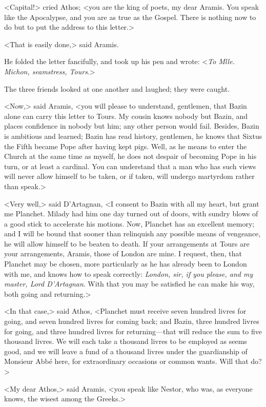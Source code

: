 <Capital!> cried Athos; <you are the king of poets, my dear Aramis. You speak like the Apocalypse, and you are as true as the Gospel. There is nothing now to do but to put the address to this letter.> 

<That is easily done,> said Aramis. 

He folded the letter fancifully, and took up his pen and wrote: <\textit{To Mlle. Michon, seamstress, Tours}.> 

The three friends looked at one another and laughed; they were caught. 

<Now,> said Aramis, <you will please to understand, gentlemen, that Bazin alone can carry this letter to Tours. My cousin knows nobody but Bazin, and places confidence in nobody but him; any other person would fail. Besides, Bazin is ambitious and learned; Bazin has read history, gentlemen, he knows that Sixtus the Fifth became Pope after having kept pigs. Well, as he means to enter the Church at the same time as myself, he does not despair of becoming Pope in his turn, or at least a cardinal. You can understand that a man who has such views will never allow himself to be taken, or if taken, will undergo martyrdom rather than speak.> 

<Very well,> said D'Artagnan, <I consent to Bazin with all my heart, but grant me Planchet. Milady had him one day turned out of doors, with sundry blows of a good stick to accelerate his motions. Now, Planchet has an excellent memory; and I will be bound that sooner than relinquish any possible means of vengeance, he will allow himself to be beaten to death. If your arrangements at Tours are your arrangements, Aramis, those of London are mine. I request, then, that Planchet may be chosen, more particularly as he has already been to London with me, and knows how to speak correctly: \textit{London, sir, if you please, and my master, Lord D'Artagnan}. With that you may be satisfied he can make his way, both going and returning.>

<In that case,> said Athos, <Planchet must receive seven hundred livres for going, and seven hundred livres for coming back; and Bazin, three hundred livres for going, and three hundred livres for returning—that will reduce the sum to five thousand livres. We will each take a thousand livres to be employed as seems good, and we will leave a fund of a thousand livres under the guardianship of Monsieur Abbé here, for extraordinary occasions or common wants. Will that do?> 

<My dear Athos,> said Aramis, <you speak like Nestor, who was, as everyone knows, the wisest among the Greeks.> 

